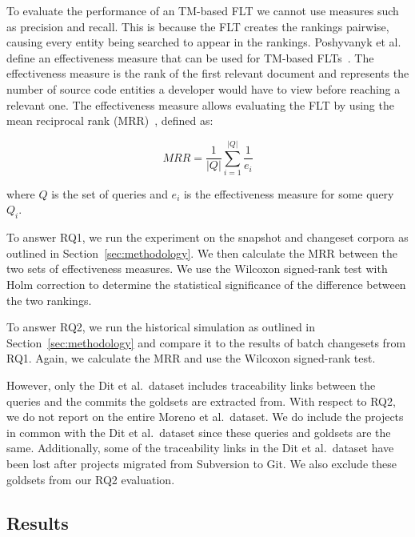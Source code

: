 To evaluate the performance of an TM-based FLT we cannot use
measures such as precision and recall. This is because the FLT creates
the rankings pairwise, causing every entity being searched to appear in the rankings.
Poshyvanyk et al. define an effectiveness measure that can be used for TM-based FLTs~\cite{Poshyvanyk-etal:2007}.
The effectiveness measure is the rank of the first relevant document
and represents the number of source code entities a developer would have to view before reaching a relevant one.
The effectiveness measure allows evaluating the FLT by using
the mean reciprocal rank (MRR)~\cite{Voorhees:1999}, defined as:

\begin{equation}
    MRR = \frac{1}{|Q|} \sum_{i=1}^{|Q|} \frac{1}{e_i}
\end{equation}

where $Q$ is the set of queries
and $e_i$ is the effectiveness measure for some query $Q_i$.

To answer RQ1, we run the experiment on the snapshot and changeset
corpora as outlined in Section~\ref{sec:methodology}.
We then calculate the MRR between the two sets of effectiveness measures.
We use the Wilcoxon signed-rank test with Holm correction to determine
the statistical significance of the difference between the two rankings.

To answer RQ2, we run the historical simulation as outlined in Section~\ref{sec:methodology}
and compare it to the results of batch changesets from RQ1.
Again, we calculate the MRR and use the Wilcoxon signed-rank test.

However, only the Dit et al.\ dataset includes traceability links between
the queries and the commits the goldsets are extracted from.
With respect to RQ2, we do not report on the entire Moreno et al.\ dataset.
We do include the projects in common with the Dit et al.\ dataset
since these queries and goldsets are the same.
Additionally, some of the traceability links in the Dit et al.\ dataset
have been lost after projects migrated from Subversion to Git.
We also exclude these goldsets from our RQ2 evaluation.



\subsection{Results}




